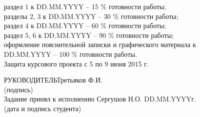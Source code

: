\documentclass[14pt,a4paper]{extreport}
\begin{document}
\begin{enumerate}
	\underline{\hspace*{16cm}}\hspace*{-16cm}раздел 1 к DD.MM.YYYY – 15 \% готовности работы;\\  
	\underline{\hspace*{16cm}}\hspace*{-16cm}разделы 2, 3 к DD.MM.YYYY – 30 \% готовности работы;\\ 
	\underline{\hspace*{16cm}}\hspace*{-16cm}раздел 4 к DD.MM.YYYY – 60 \% готовности работы;\\
	\underline{\hspace*{16cm}}\hspace*{-16cm}раздел 5, 6 к DD.MM.YYYY  –  90 \% готовности работы;\\
	\underline{\hspace*{16cm}}\hspace*{-16cm}оформление пояснительной записки и графического материала к\\
	\underline{\hspace*{16cm}}\hspace*{-16cm}DD.MM.YYYY – 100 \% готовности работы.\\
	\underline{\hspace*{16cm}}\hspace*{-16cm}Защита курсового проекта с 5 по 9 июня 2015 г.\\
	\end{enumerate}
	\hspace*{7cm}РУКОВОДИТЕЛЬ\underline{\hspace*{6cm}}\hspace*{-3.9cm}Третьяков Ф.И.\\
	\hspace*{11.5cm}\small (подпись) \normalsize\\
	\bigskip
	Задание принял к исполнению \underline{\hspace*{10.5cm}}\hspace*{-8cm}Сергушов Н.О. DD.MM.YYYYг.\\
	\hspace*{7cm}\small (дата и подпись студента) \normalsize\\
	\newpage
	\pagestyle{plain}
	
	\renewcommand\contentsname{\center\normalsize \textbf{СОДЕРЖАНИЕ} \endcenter}
	\tableofcontents
	\endcenter
	
\end{document}
